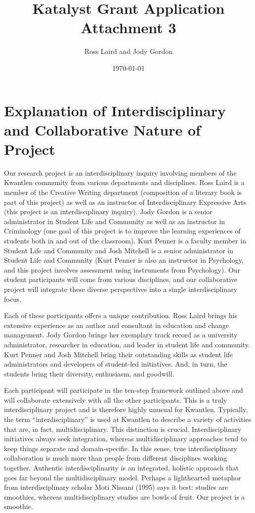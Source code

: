 \documentclass[letterpaper,10pt,headsepline]{scrreprt}
\author{Ross Laird and Jody Gordon}
\title{Katalyst Grant Application Attachment 3}
\date{\today}
\begin{document}
\vspace*{1cm}

\section{Explanation of Interdisciplinary and Collaborative Nature of Project}

Our research project is an interdisciplinary inquiry involving members of the
Kwantlen community from various departments and disciplines. Ross Laird is a
member of the Creative Writing department (composition of a literary book is
part of this project) as well as an instructor of Interdisciplinary Expressive
Arts (this project is an interdisciplinary inquiry). Jody Gordon is a senior
administrator in Student Life and Community as well as an instructor in
Criminology (one goal of this project is to improve the learning experiences
of students both in and out of the classroom). Kurt Penner is a faculty member
in Student Life and Community and Josh Mitchell is a senior administrator in
Student Life and Community (Kurt Penner is also an instructor in Psychology,
and this project involves assessment using instruments from Psychology). Our
student participants will come from various disciplines, and our collaborative
project will integrate these diverse perspectives into a single
interdisciplinary focus.

Each of these participants offers a unique contribution. Ross Laird brings his
extensive experience as an author and consultant in education and change
management. Jody Gordon brings her exemplary track record as a university
administrator, researcher in education, and leader in student life and
community. Kurt Penner and Josh Mitchell bring their outstanding skills as
student life administrators and developers of student-led initiatives. And,
in turn, the students bring their diversity, enthusiasm, and goodwill.

Each participant will participate in the ten-step framework outlined above and
will collaborate extensively with all the other participants. This is a truly
interdisciplinary project and is therefore highly unusual for Kwantlen.
Typically, the term ``interdisciplinary'' is used at Kwantlen to describe a
variety of activities that are, in fact, multidisciplinary. This distinction
is crucial. Interdisciplinary initiatives always seek integration, whereas
multidisciplinary approaches tend to keep things separate and domain-specific.
In this sense, true interdisciplinary collaboration is much more than people
from different disciplines working together. Authentic interdisciplinarity is
an integrated, holistic approach that goes far beyond the multidisciplinary
model. Perhaps a lighthearted metaphor from interdisciplinary scholar Moti
Nissani (1995) says it best: studies are smoothies, whereas multidisciplinary
studies are bowls of fruit. Our project is a smoothie.
\end{document}
